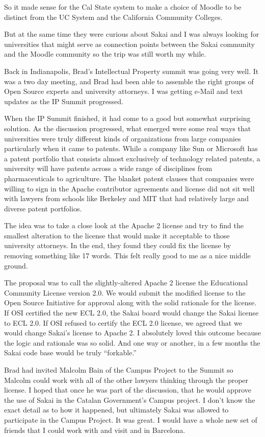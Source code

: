 \documentclass[12pt]{book}
\begin{document}
So it made sense for the Cal State
system to make a choice of Moodle to
be distinct from the UC System
and the California Community Colleges.

But at the same time they were curious about Sakai
and I was always looking for universities that
might serve as connection points between the
Sakai community and the Moodle community so
the trip was still worth my while.

Back in Indianapolis, Brad's Intellectual
Property summit was going very well.  It was
a two day meeting, and Brad had been able
to assemble the right groups of Open Source
experts and university attorneys.   I was getting
e-Mail and text updates as the IP Summit
progressed.

When the IP Summit finished, it had come to
a good but somewhat surprising solution.  As the
discussion progressed, what emerged were some
real ways that universities were truly
different kinds of organizations from large
companies particularly when it came to patents.
While a company like Sun or Microsoft has a
patent portfolio that consists almost exclusively
of technology related patents, a university
will have patents across a wide range of
disciplines from pharmaceuticals to
agriculture.   The blanket patent clauses that
companies were willing to sign in the Apache
contributor agreements and license did not
sit well with lawyers from schools like
Berkeley and MIT that had relatively large
and diverse patent portfolios.

The idea was to take a
close look at the Apache 2 license and try to
find the smallest alteration to the license
that would make it acceptable to those university
attorneys.  In the end, they found they
could fix the license by removing something like
17 words.  This felt really good to me as a
nice middle ground.

The proposal was to call the slightly-altered
Apache 2 license the Educational Community
License version 2.0.   We would submit the
modified license to the Open Source Initiative
for approval along with the solid rationale
for the license.  If OSI certified the new
ECL 2.0, the Sakai board would change the Sakai
license to ECL 2.0.  If OSI refused to
certify the ECL 2.0 license, we agreed that
we would change Sakai's license to Apache 2.
I absolutely loved this outcome because the
logic and rationale was so solid.  And one way
or another, in a few months the Sakai code base
would be truly ``forkable.''

Brad had invited Malcolm Bain of the Campus
Project to the Summit so Malcolm could work with all of the other
lawyers thinking through the proper license.
I hoped that once he was part of the discussion, that
he would approve the use of Sakai in the Catalan
Government's Campus project.  I don't know the exact
detail as to how it happened, but ultimately
Sakai was allowed to participate in the Campus
Project.  It was great.  I would have a whole new set
of friends that I could work with and visit and in
Barcelona.
\end{document}
